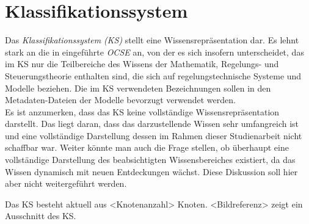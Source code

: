 \section{Klassifikationssystem}
\label{Ch:Ergebnisse:Sec:KS}
Das \textit{Klassifikationssystem (KS)} stellt eine Wissensrepräsentation dar. Es lehnt stark an die in \cite{KNHE20a} eingeführte \textit{OCSE} an, von der es sich insofern unterscheidet, das im KS nur die Teilbereiche des Wissens der Mathematik, Regelungs- und Steuerungstheorie enthalten sind, die sich auf regelungstechnische Systeme und Modelle beziehen. Die im KS verwendeten Bezeichnungen sollen in den Metadaten-Dateien der Modelle bevorzugt verwendet werden. \\
Es ist anzumerken, dass das KS keine vollständige Wissensrepräsentation darstellt. Das liegt daran, dass das darzustellende Wissen sehr umfangreich ist und eine vollständige Darstellung dessen im Rahmen dieser Studienarbeit nicht schaffbar war. Weiter könnte man auch die Frage stellen, ob überhaupt eine vollständige Darstellung des beabsichtigten Wissensbereiches existiert, da das Wissen dynamisch mit neuen Entdeckungen wächst. Diese Diskussion soll hier aber nicht weitergeführt werden. 

Das KS besteht aktuell aus <Knotenanzahl> Knoten. <Bildreferenz> zeigt ein Ausschnitt des KS.
